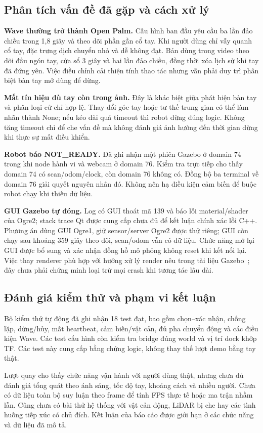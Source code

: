 \documentclass[12pt,a4paper]{article}
\begin{document}
\subsection{Phân tích vấn đề đã gặp và cách xử lý}
\textbf{Wave thường trở thành Open Palm.} Cấu hình ban đầu yêu cầu ba lần đảo chiều trong 1,8 giây và theo dõi phần gần cổ tay. Khi người dùng chỉ vẫy quanh cổ tay, đặc trưng dịch chuyển nhỏ và dễ không đạt. Bản dùng trong video theo dõi đầu ngón tay, cửa sổ 3 giây và hai lần đảo chiều, đồng thời xóa lịch sử khi tay đã đứng yên. Việc điều chỉnh cải thiện tính thao tác nhưng vẫn phải duy trì phân biệt bàn tay mở dùng để dừng.

\textbf{Mất tín hiệu dù tay còn trong ảnh.} Đây là khác biệt giữa phát hiện bàn tay và phân loại cử chỉ hợp lệ. Thay đổi góc tay hoặc tư thế trung gian có thể làm nhãn thành None; nếu kéo dài quá timeout thì robot dừng đúng logic. Không tăng timeout chỉ để che vấn đề mà không đánh giá ảnh hưởng đến thời gian dừng khi thực sự mất điều khiển.

\textbf{Robot báo NOT\_READY.} Đã ghi nhận một phiên Gazebo ở domain 74 trong khi node hành vi và webcam ở domain 76. Kiểm tra trực tiếp cho thấy domain 74 có scan/odom/clock, còn domain 76 không có. Đồng bộ ba terminal về domain 76 giải quyết nguyên nhân đó. Không nên hạ điều kiện cảm biến để buộc robot chạy khi thiếu dữ liệu.

\textbf{GUI Gazebo tự đóng.} Log có GUI thoát mã 139 và báo lỗi material/shader của Ogre2; stack trace Qt được cung cấp chưa đủ để kết luận chính xác lỗi C++. Phương án dùng GUI Ogre1, giữ sensor/server Ogre2 được thử riêng; GUI còn chạy sau khoảng 359 giây theo dõi, scan/odom vẫn có dữ liệu. Chức năng mở lại GUI được bổ sung và xác nhận đồng hồ mô phỏng không reset khi kết nối lại. Việc thay renderer phù hợp với hướng xử lý render nêu trong tài liệu Gazebo~\cite{gz}; đây chưa phải chứng minh loại trừ mọi crash khi tương tác lâu dài.

\subsection{Đánh giá kiểm thử và phạm vi kết luận}
Bộ kiểm thử tự động đã ghi nhận 18 test đạt, bao gồm chọn--xác nhận, chống lặp, dừng/hủy, mất heartbeat, cảm biến/vật cản, đủ pha chuyển động và các điều kiện Wave. Các test cấu hình còn kiểm tra bridge đúng world và vị trí dock khớp TF. Các test này cung cấp bằng chứng logic, không thay thế lượt demo bằng tay thật.

Lượt quay cho thấy chức năng vận hành với người dùng thật, nhưng chưa đủ đánh giá tổng quát theo ánh sáng, tốc độ tay, khoảng cách và nhiều người. Chưa có dữ liệu toàn bộ suy luận theo frame để tính FPS thực tế hoặc ma trận nhầm lẫn. Cũng chưa có bài thử hệ thống với vật cản động, LiDAR bị che hay các tình huống tiếp xúc có chủ đích. Kết luận của báo cáo được giới hạn ở các chức năng và dữ liệu đã mô tả.
\end{document}
